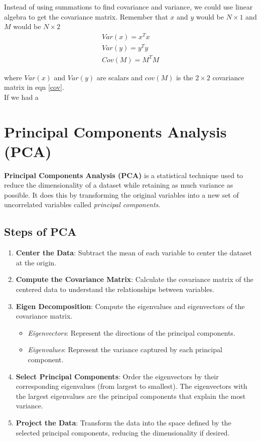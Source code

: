 \documentclass{article}
\begin{document}
Instead of using summations to find covariance and variance, we could use linear algebra to get the covariance matrix. Remember that $x$ and $y$ would be $N \times 1$ and $M$ would be $N \times 2$
\begin{align}
    Var(x) = x^T x \\
    Var(y) = y^T y\\
    Cov(M) = M^T M
\end{align}

where $Var(x)$ and $Var(y)$ are scalars and $cov(M)$ is the $2 \times 2$ covariance matrix in eqn \ref{cov}. \\

If we had a 


\section{Principal Components Analysis (PCA)}

\textbf{Principal Components Analysis (PCA)} is a statistical technique used to reduce the dimensionality of a dataset while retaining as much variance as possible. It does this by transforming the original variables into a new set of uncorrelated variables called \textit{principal components}.

\subsection*{Steps of PCA}

\begin{enumerate}
    \item \textbf{Center the Data}: Subtract the mean of each variable to center the dataset at the origin.
    \item \textbf{Compute the Covariance Matrix}: Calculate the covariance matrix of the centered data to understand the relationships between variables.
    \item \textbf{Eigen Decomposition}: Compute the eigenvalues and eigenvectors of the covariance matrix.
    \begin{itemize}
        \item \textit{Eigenvectors}: Represent the directions of the principal components.
        \item \textit{Eigenvalues}: Represent the variance captured by each principal component.
    \end{itemize}
    \item \textbf{Select Principal Components}: Order the eigenvectors by their corresponding eigenvalues (from largest to smallest). The eigenvectors with the largest eigenvalues are the principal components that explain the most variance.
    \item \textbf{Project the Data}: Transform the data into the space defined by the selected principal components, reducing the dimensionality if desired.
\end{enumerate}
\end{document}
